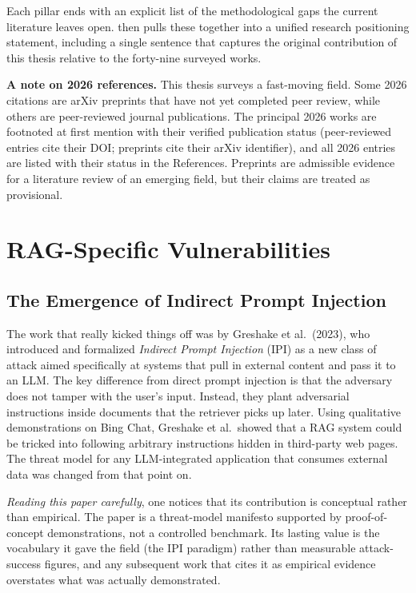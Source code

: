 \documentclass[12pt,a4paper]{report}
\begin{document}
Each pillar ends with an explicit list of the methodological gaps the current literature leaves open.  then pulls these together into a unified research positioning statement, including a single sentence that captures the original contribution of this thesis relative to the forty-nine surveyed works.

\begin{notebox}
\textbf{A note on 2026 references.} This thesis surveys a fast-moving field. Some 2026 citations are arXiv preprints that have not yet completed peer review, while others are peer-reviewed journal publications. The principal 2026 works are footnoted at first mention with their verified publication status (peer-reviewed entries cite their DOI; preprints cite their arXiv identifier), and all 2026 entries are listed with their status in the References. Preprints are admissible evidence for a literature review of an emerging field, but their claims are treated as provisional.
\end{notebox}



\newpage
\section{RAG-Specific Vulnerabilities}
\label{sec:rag-vuln}

\subsection{The Emergence of Indirect Prompt Injection}

The work that really kicked things off was by Greshake et al.\ (2023), who introduced and formalized \emph{Indirect Prompt Injection} (IPI) as a new class of attack aimed specifically at systems that pull in external content and pass it to an LLM. The key difference from direct prompt injection is that the adversary does not tamper with the user's input. Instead, they plant adversarial instructions inside documents that the retriever picks up later. Using qualitative demonstrations on Bing Chat, Greshake et al.\ showed that a RAG system could be tricked into following arbitrary instructions hidden in third-party web pages. The threat model for any LLM-integrated application that consumes external data was changed from that point on.

\begin{critbox}
\textit{Reading this paper carefully}, one notices that its contribution is conceptual rather than empirical. The paper is a threat-model manifesto supported by proof-of-concept demonstrations, not a controlled benchmark. Its lasting value is the vocabulary it gave the field (the IPI paradigm) rather than measurable attack-success figures, and any subsequent work that cites it as empirical evidence overstates what was actually demonstrated.
\end{critbox}
\end{document}
